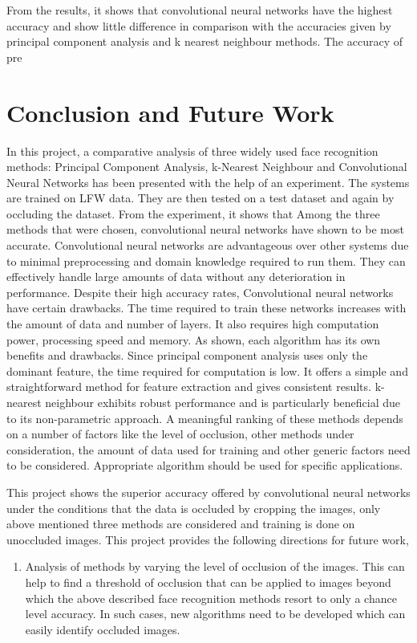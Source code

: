 \documentclass[conference]{IEEEtran}
\begin{document}
\begin{enumerate}
From the results, it shows that convolutional neural networks have the highest accuracy and show little difference in comparison with the accuracies given by principal component analysis and k nearest neighbour methods. The accuracy of pre

\section{Conclusion and Future Work}
\label{sec: 6.Conclusion and Future Work}

In this project, a comparative analysis of three widely used face recognition methods: Principal Component Analysis, k-Nearest Neighbour and Convolutional Neural Networks has been presented with the help of an experiment. The systems are trained on LFW data. They are then tested on a test dataset and again by occluding the dataset. From the experiment, it shows that Among the three methods that were chosen, convolutional neural networks have shown to be most accurate. Convolutional neural networks are advantageous over other systems due to minimal preprocessing and domain knowledge required to run them. They can effectively handle large amounts of data without any deterioration in performance. Despite their high accuracy rates, Convolutional neural networks have certain drawbacks. The time required to train these networks increases with the amount of data and number of layers. It also requires high computation power, processing speed and memory. As shown, each algorithm has its own benefits and drawbacks. Since principal component analysis uses only the dominant feature, the time required for computation is low. It offers a simple and straightforward method for feature extraction and gives consistent results. k-nearest neighbour exhibits robust performance and is particularly beneficial due to its non-parametric approach. A meaningful ranking of these methods depends on a number of factors like the level of occlusion, other methods under consideration, the amount of data used for training and other generic factors need to be considered. Appropriate algorithm should be used for specific applications. 

This project shows the superior accuracy offered by convolutional neural networks under the conditions that the data is occluded by cropping the images, only above mentioned three methods are considered and training is done on unoccluded images. This project provides the following directions for future work, 
\begin{enumerate}
\item Analysis of methods by varying the level of occlusion of the images. This can help to find a threshold of occlusion that can be applied to images beyond which the above described face recognition methods resort to only a chance level accuracy. In such cases, new algorithms need to be developed which can easily identify occluded images.


\end{enumerate}
\end{enumerate}
\end{document}
